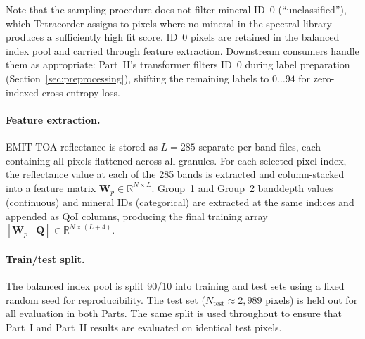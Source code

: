 \documentclass[11pt]{report}
\newcommand{\R}{\mathbb{R}}
\begin{document}
Note that the sampling procedure does not filter mineral ID~0 (``unclassified''), which Tetracorder assigns to pixels where no mineral in the spectral library produces a sufficiently high fit score. ID~0 pixels are retained in the balanced index pool and carried through feature extraction. Downstream consumers handle them as appropriate: Part~II's transformer filters ID~0 during label preparation (Section~\ref{sec:preprocessing}), shifting the remaining labels to $0 \ldots 94$ for zero-indexed cross-entropy loss.

\paragraph{Feature extraction.}
EMIT TOA reflectance is stored as $L = 285$ separate per-band files, each containing all pixels flattened across all granules. For each selected pixel index, the reflectance value at each of the 285 bands is extracted and column-stacked into a feature matrix $\mathbf{W}_p \in \R^{N \times L}$. Group~1 and Group~2 banddepth values (continuous) and mineral IDs (categorical) are extracted at the same indices and appended as QoI columns, producing the final training array $[\mathbf{W}_p \mid \mathbf{Q}] \in \R^{N \times (L + 4)}$.

\paragraph{Train/test split.}
The balanced index pool is split 90/10 into training and test sets using a fixed random seed for reproducibility. The test set ($N_{\text{test}} \approx 2{,}989$ pixels) is held out for all evaluation in both Parts. The same split is used throughout to ensure that Part~I and Part~II results are evaluated on identical test pixels.
\end{document}

